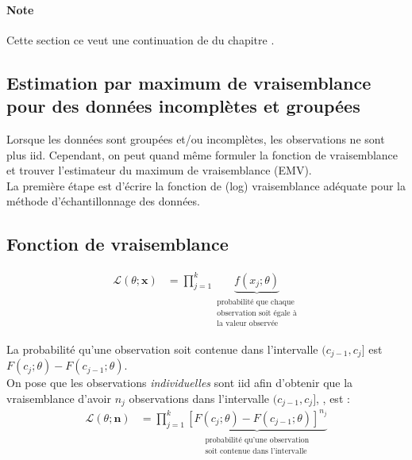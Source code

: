 \documentclass[10pt, french]{article}
\begin{document}
\begin{multicols*}{2}
\paragraph{Note}	Cette section ce veut une continuation de \underline{} du chapitre \underline{}.

\subsection*{Estimation par maximum de vraisemblance pour des données incomplètes et groupées}
\begin{rappel_enhanced}[Contexte]
Lorsque les données sont groupées et/ou incomplètes, les observations ne sont plus iid. Cependant, on peut quand même formuler la fonction de vraisemblance et trouver l'estimateur du maximum de vraisemblance (EMV).	\\

La première étape est d'écrire la fonction de (log) vraisemblance adéquate pour la méthode d'échantillonnage des données.
\end{rappel_enhanced}


\setlength{\mathindent}{-0.75cm}
\subsection{Fonction de vraisemblance}
\begin{definitionNOHFILLprop}
\begin{align*}
	\mathcal{L}(\theta; \bm{x})
	&=	\prod^{k}_{j	=	1} \underbrace{f(x_{j}; \theta)}_{\substack{\text{probabilité que chaque}\\ \text{observation soit égale à}\\ \text{la valeur observée}}}
\end{align*}
\end{definitionNOHFILLprop}

\begin{definitionNOHFILLprop}
La probabilité qu'une observation soit contenue dans l'intervalle $(c_{j - 1}, c_{j}]$ est $F(c_{j}; \theta)	-	F(c_{j - 1}; \theta)$. \\

On pose que les observations \textit{individuelles} sont iid afin d'obtenir que la vraisemblance d'avoir $n_{j}$ observations dans l'intervalle $(c_{j - 1}, c_{j}]$, , est :
\begin{align*}
	\mathcal{L}(\theta; \bm{n})
	&=	\prod^{k}_{j	=	1} \underbrace{\left[F(c_{j}; \theta)	-	F(c_{j - 1}; \theta)\right]^{n_{j}}}_{\substack{\text{probabilité qu'une observation}\\ \text{soit contenue dans l'intervalle}}}
\end{align*}
\end{definitionNOHFILLprop}


\end{multicols*}
\end{document}
